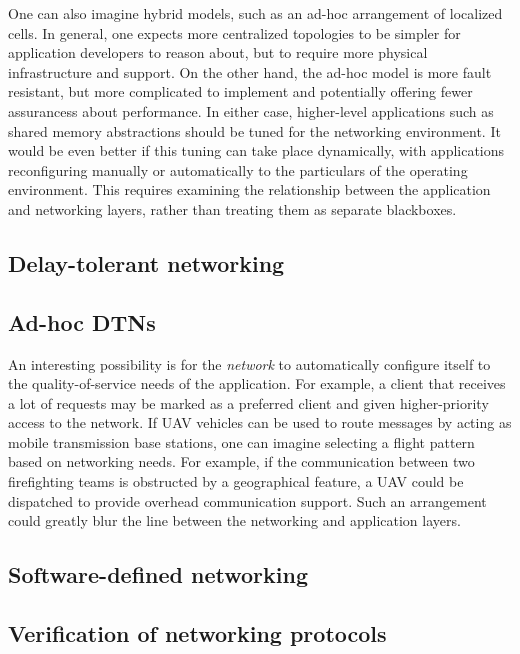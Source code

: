 \documentclass[]             %
{NASA}                       %
\theoremstyle{definition}
\begin{document}
One can also imagine hybrid models, such as an ad-hoc arrangement of
localized cells. In general, one expects more centralized topologies to
be simpler for application developers to reason about, but to require
more physical infrastructure and support. On the other hand, the ad-hoc
model is more fault resistant, but more complicated to implement and
potentially offering fewer assurancess about performance. In either
case, higher-level applications such as shared memory abstractions
should be tuned for the networking environment. It would be even better
if this tuning can take place dynamically, with applications
reconfiguring manually or automatically to the particulars of the
operating environment. This requires examining the relationship between
the application and networking layers, rather than treating them as
separate blackboxes.

\hypertarget{delay-tolerant-networking}{%
\subsection{Delay-tolerant networking}\label{delay-tolerant-networking}}

\hypertarget{ad-hoc-dtns}{%
\subsection{Ad-hoc DTNs}\label{ad-hoc-dtns}}

An interesting possibility is for the \emph{network} to automatically
configure itself to the quality-of-service needs of the application. For
example, a client that receives a lot of requests may be marked as a
preferred client and given higher-priority access to the network. If UAV
vehicles can be used to route messages by acting as mobile transmission
base stations, one can imagine selecting a flight pattern based on
networking needs. For example, if the communication between two
firefighting teams is obstructed by a geographical feature, a UAV could
be dispatched to provide overhead communication support. Such an
arrangement could greatly blur the line between the networking and
application layers.

\hypertarget{software-defined-networking}{%
\subsection{Software-defined
networking}\label{software-defined-networking}}

\hypertarget{verification-of-networking-protocols}{%
\subsection{Verification of networking
protocols}\label{verification-of-networking-protocols}}
\end{document}
